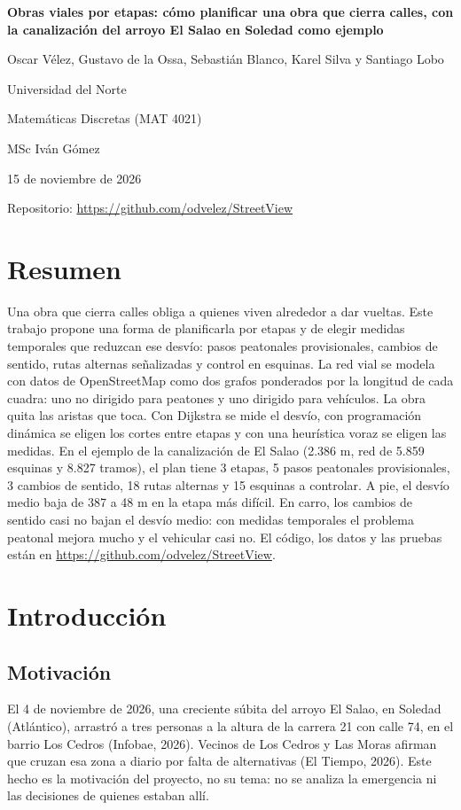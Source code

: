 \documentclass[12pt,letterpaper]{article}
\newcommand{\repo}{\url{https://github.com/odvelez/StreetView}}
\begin{document}
\begin{titlepage}
\centering
\vspace*{4cm}
{\bfseries Obras viales por etapas: cómo planificar una obra que cierra calles, con la canalización del arroyo El Salao en Soledad como ejemplo\par}
\vspace{2cm}
Oscar Vélez, Gustavo de la Ossa, Sebastián Blanco, Karel Silva y Santiago Lobo\par
\vspace{1cm}
Universidad del Norte\par
Matemáticas Discretas (MAT 4021)\par
MSc Iván Gómez\par
15 de noviembre de 2026\par
\vspace{1.5cm}
Repositorio: \repo\par
\end{titlepage}

\section*{Resumen}
Una obra que cierra calles obliga a quienes viven alrededor a dar vueltas. Este trabajo propone una forma de planificarla por etapas y de elegir medidas temporales que reduzcan ese desvío: pasos peatonales provisionales, cambios de sentido, rutas alternas señalizadas y control en esquinas. La red vial se modela con datos de OpenStreetMap como dos grafos ponderados por la longitud de cada cuadra: uno no dirigido para peatones y uno dirigido para vehículos. La obra quita las aristas que toca. Con Dijkstra se mide el desvío, con programación dinámica se eligen los cortes entre etapas y con una heurística voraz se eligen las medidas. En el ejemplo de la canalización de El Salao (2.386 m, red de 5.859 esquinas y 8.827 tramos), el plan tiene 3 etapas, 5 pasos peatonales provisionales, 3 cambios de sentido, 18 rutas alternas y 15 esquinas a controlar. A pie, el desvío medio baja de 387 a 48 m en la etapa más difícil. En carro, los cambios de sentido casi no bajan el desvío medio: con medidas temporales el problema peatonal mejora mucho y el vehicular casi no. El código, los datos y las pruebas están en \repo.

\section{Introducción}
\subsection{Motivación}
El 4 de noviembre de 2026, una creciente súbita del arroyo El Salao, en Soledad (Atlántico), arrastró a tres personas a la altura de la carrera 21 con calle 74, en el barrio Los Cedros (Infobae, 2026). Vecinos de Los Cedros y Las Moras afirman que cruzan esa zona a diario por falta de alternativas (El Tiempo, 2026). Este hecho es la motivación del proyecto, no su tema: no se analiza la emergencia ni las decisiones de quienes estaban allí.
\end{document}
